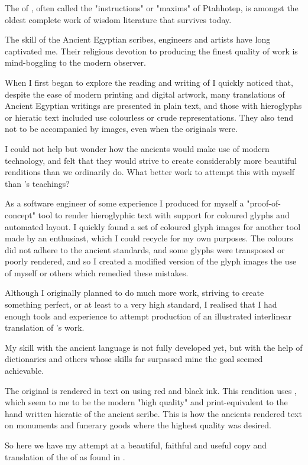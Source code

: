 The \textit{} of , often called the "instructions" or "maxims" of Ptahhotep, is amongst the oldest complete work of wisdom literature that survives today.

The skill of the Ancient Egyptian scribes, engineers and artists have long captivated me. Their religious devotion to producing the finest quality of work is mind-boggling to the modern observer.

When I first began to explore the reading and writing of  I quickly noticed that, despite the ease of modern printing and digital artwork, many translations of Ancient Egyptian writings are presented in plain text, and those with hieroglyphs or hieratic text included use colourless or crude representations. They also tend not to be accompanied by images, even when the originals were.

I could not help but wonder how the ancients would make use of modern technology, and felt that they would strive to create considerably more beautiful renditions than we ordinarily do. What better work to attempt this with myself than 's teachings?

As a software engineer of some experience I produced for myself a "proof-of-concept" tool to render hieroglyphic text with support for coloured glyphs and automated layout. I quickly found a set of coloured glyph images for another tool made by an enthusiast, which I could recycle for my own purposes. The colours did not adhere to the ancient standards, and some glyphs were transposed or poorly rendered, and so I created a modified version of the glyph images the use of myself or others which remedied these mistakes.

Although I originally planned to do much more work, striving to create something perfect, or at least to a very high standard, I realised that I had enough tools and experience to attempt production of an illustrated interlinear translation of 's work.

My skill with the ancient language is not fully developed yet, but with the help of dictionaries and others whose skills far surpassed mine the goal seemed achievable.

The original is rendered in  text on  using red and black ink. This rendition uses , which seem to me to be the modern "high quality" and print-equivalent to the hand written hieratic of the ancient scribe. This is how the ancients rendered text on monuments and funerary goods where the highest quality was desired.

So here we have my attempt at a beautiful, faithful and useful copy and translation of the  of  as found in .

